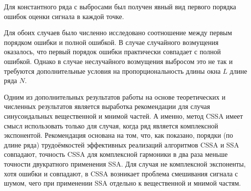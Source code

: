 \documentclass[specialist,
               substylefile = spbu.rtx,
               subf,href,colorlinks=true, 12pt]{disser}
\begin{document}
Для константного ряда с выбросами был получен явный вид первого порядка ошибок оценки сигнала в каждой точке.

Для обоих случаев было численно исследовано соотношение между первым порядком ошибки и полной ошибкой.
В случае случайного возмущения оказалось, что первый порядок ошибки практически совпадает с полной ошибкой. Однако в случае неслучайного возмущения выбросом это не так и требуются дополнительные условия на пропорциональность длины окна $L$ длине ряда $N$.

Одним из дополнительных результатов работы на основе теоретических и численных результатов является выработка рекомендации для случая синусоидальных вещественной и мнимой частей. А именно, метод CSSA имеет смысл использовать только для случая, когда ряд является комплексной экспонентой. Рекомендация основана на том, что, как показано, порядки (по длине ряда) трудоёмкостей эффективных реализаций алгоритмов CSSA и SSA совпадают, точность CSSA для комплексной гармоники в два раза меньше точности двукратного применения SSA. Для случая не комплексной экспоненты, хотя ошибки и совпадают, в CSSA возникает проблема смешивания сигнала с шумом, чего при применении SSA отдельно к вещественной и мнимой частям. %



\end{document}

